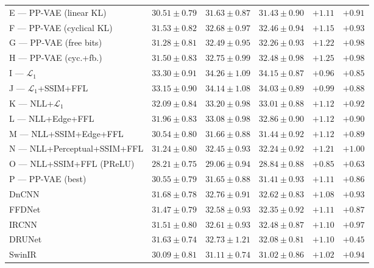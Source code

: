 \documentclass[12pt, a4paper, twoside, openright]{book}
\begin{document}
\begin{table}[htbp]
{\begin{tabular}{lccccc}
E — PP-VAE (linear KL)                        & $30.51\pm0.79$ & $31.63\pm0.87$ & $31.43\pm0.90$ & $+1.11$ & $+0.91$ \\
F — PP-VAE (cyclical KL)                      & $31.53\pm0.82$ & $32.68\pm0.97$ & $32.46\pm0.94$ & $+1.15$ & $+0.93$ \\
G — PP-VAE (free bits)                        & $31.28\pm0.81$ & $32.49\pm0.95$ & $32.26\pm0.93$ & $+1.22$ & $+0.98$ \\
H — PP-VAE (cyc.+fb.)                         & $31.50\pm0.83$ & $32.75\pm0.99$ & $32.48\pm0.98$ & $+1.25$ & $+0.98$ \\
I — $\mathcal{L}_1$                           & $33.30\pm0.91$ & $34.26\pm1.09$ & $34.15\pm0.87$ & $+0.96$ & $+0.85$ \\
J — $\mathcal{L}_1$+SSIM+FFL                 & $33.15\pm0.90$ & $34.14\pm1.08$ & $34.03\pm0.89$ & $+0.99$ & $+0.88$ \\
K — NLL+$\mathcal{L}_1$                       & $32.09\pm0.84$ & $33.20\pm0.98$ & $33.01\pm0.88$ & $+1.12$ & $+0.92$ \\
L — NLL+Edge+FFL                              & $31.96\pm0.83$ & $33.08\pm0.98$ & $32.86\pm0.90$ & $+1.12$ & $+0.90$ \\
M — NLL+SSIM+Edge+FFL                         & $30.54\pm0.80$ & $31.66\pm0.88$ & $31.44\pm0.92$ & $+1.12$ & $+0.89$ \\
N — NLL+Perceptual+SSIM+FFL                   & $31.24\pm0.80$ & $32.45\pm0.93$ & $32.24\pm0.92$ & $+1.21$ & $+1.00$ \\
O — NLL+SSIM+FFL (PReLU)                      & $28.21\pm0.75$ & $29.06\pm0.94$ & $28.84\pm0.88$ & $+0.85$ & $+0.63$ \\
P — PP-VAE (best)                             & $30.55\pm0.79$ & $31.65\pm0.88$ & $31.41\pm0.93$ & $+1.11$ & $+0.86$ \\
\midrule
DnCNN \cite{zhang_beyond_2017}                & $31.68\pm0.78$ & $32.76\pm0.91$ & $32.62\pm0.83$ & $+1.08$ & $+0.93$ \\
FFDNet \cite{zhang_ffdnet_2018}               & $31.47\pm0.79$ & $32.58\pm0.93$ & $32.35\pm0.92$ & $+1.11$ & $+0.87$ \\
IRCNN \cite{zhang_learning_2017}              & $31.51\pm0.80$ & $32.61\pm0.93$ & $32.48\pm0.87$ & $+1.10$ & $+0.97$ \\
DRUNet \cite{zhang_plug_2021}                 & $31.63\pm0.74$ & $32.73\pm1.21$ & $32.08\pm0.81$ & $+1.10$ & $+0.45$ \\
SwinIR \cite{liang_swinir_2021}               & $30.09\pm0.81$ & $31.11\pm0.74$ & $31.02\pm0.86$ & $+1.02$ & $+0.94$ \\
\bottomrule
\end{tabular}%
}
\end{table}
\end{document}
